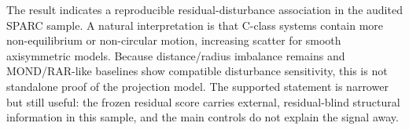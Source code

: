 \documentclass[11pt]{article}
\begin{document}
The result indicates a reproducible residual-disturbance association in the audited SPARC sample. A natural interpretation is that C-class systems contain more non-equilibrium or non-circular motion, increasing scatter for smooth axisymmetric models. Because distance/radius imbalance remains and MOND/RAR-like baselines show compatible disturbance sensitivity, this is not standalone proof of the projection model. The supported statement is narrower but still useful: the frozen residual score carries external, residual-blind structural information in this sample, and the main controls do not explain the signal away.
\end{document}
